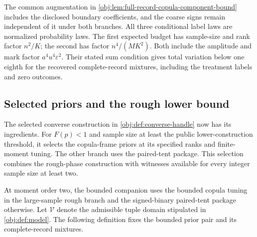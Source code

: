 The common augmentation in \cref{obj:lem:full-record-copula-component-bound} includes the disclosed boundary coefficients, and the coarse signs remain independent of it under both branches. All three conditional label laws are normalized probability laws. The first expected budget has sample-size and rank factor \(n^2/K\); the second has factor \(n^4/(MK^2)\). Both include the amplitude and mark factor \(a^4u^4\varepsilon^2\). Their stated sum condition gives total variation below one eighth for the recovered complete-record mixtures, including the treatment labels and zero outcomes.

\subsection{Selected priors and the rough lower bound}

The selected converse construction in \cref{obj:def:converse-handle} now has its ingredients. For \(F(p)<1\) and sample size at least the public lower-construction threshold, it selects the copula-frame priors at its specified ranks and finite-moment tuning. The other branch uses the paired-tent package. This selection combines the rough-phase construction with witnesses available for every integer sample size at least two.

At moment order two, the bounded companion uses the bounded copula tuning in the large-sample rough branch and the signed-binary paired-tent package otherwise. Let \(\mathcal V\) denote the admissible tuple domain stipulated in \cref{obj:def:model}. The following definition fixes the bounded prior pair and its complete-record mixtures.

